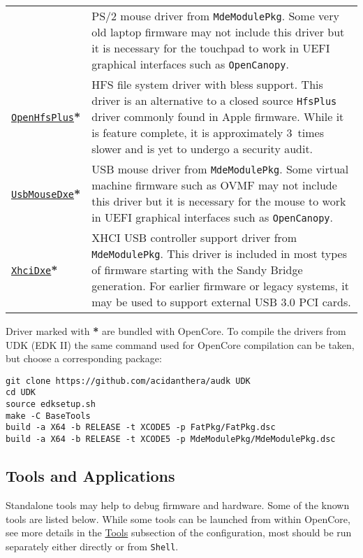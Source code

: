 \documentclass[]{article}
\makeatletter
\renewcommand{\label}[1]{%
\zref@wrapper@immediate{\oldlabel{#1}}}  %
\makeatother
\begin{document}
\begin{tabular}{p{1.3in}p{5.55in}}
& PS/2 mouse driver from \texttt{MdeModulePkg}. Some very old laptop firmware
  may not include this driver but it is necessary for the touchpad to work
  in UEFI graphical interfaces such as \texttt{OpenCanopy}. \\
\href{https://github.com/acidanthera/OpenCorePkg}{\texttt{OpenHfsPlus}}\textbf{*}
& HFS file system driver with bless support. This driver is an alternative to
  a closed source \texttt{HfsPlus} driver commonly found in Apple firmware. While
  it is feature complete, it is approximately 3~times slower and is yet to undergo
  a security audit. \\
\href{https://github.com/acidanthera/audk}{\texttt{UsbMouseDxe}}\textbf{*}
& USB mouse driver from \texttt{MdeModulePkg}. Some virtual machine firmware
  such as OVMF may not include this driver but it is necessary for the mouse to work
  in UEFI graphical interfaces such as \texttt{OpenCanopy}. \\
\href{https://github.com/acidanthera/audk}{\texttt{XhciDxe}}\textbf{*}
& XHCI USB controller support driver from \texttt{MdeModulePkg}. This driver is
  included in most types of firmware starting with the Sandy Bridge generation. For earlier firmware
  or legacy systems, it may be used to support external USB 3.0 PCI cards.
\end{tabular}

Driver marked with \textbf{*} are bundled with OpenCore.
To compile the drivers from UDK (EDK II) the same command used for
OpenCore compilation can be taken, but choose a corresponding package:
\begin{lstlisting}[label=compileudk, style=ocbash]
git clone https://github.com/acidanthera/audk UDK
cd UDK
source edksetup.sh
make -C BaseTools
build -a X64 -b RELEASE -t XCODE5 -p FatPkg/FatPkg.dsc
build -a X64 -b RELEASE -t XCODE5 -p MdeModulePkg/MdeModulePkg.dsc
\end{lstlisting}

\subsection{Tools and Applications}\label{uefitools}

Standalone tools may help to debug firmware and hardware. Some of the known tools are listed below.
While some tools can be launched from within OpenCore, see more details in
the \hyperref[misctools]{Tools} subsection of the configuration, most should be run
separately either directly or from \texttt{Shell}.
\end{document}
